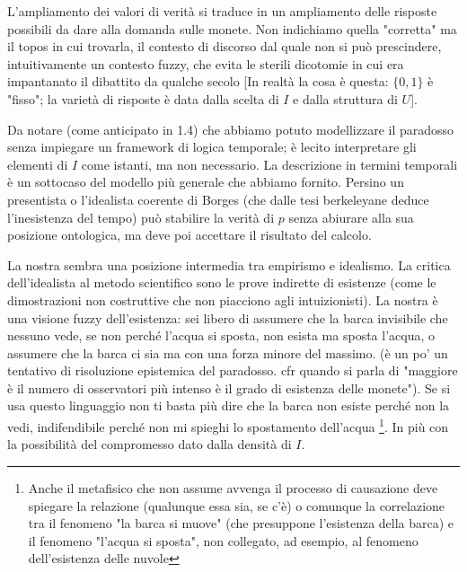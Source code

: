 L'ampliamento dei valori di verità si traduce in un ampliamento delle risposte possibili da dare alla domanda sulle monete. Non indichiamo quella "corretta" ma il topos in cui trovarla, il contesto di discorso dal quale non si può prescindere, intuitivamente un contesto fuzzy, che evita le sterili dicotomie in cui era impantanato il dibattito da qualche secolo [In realtà la cosa è questa: $\{0,1\}$ è "fisso"; la varietà di risposte è data dalla scelta di $I$ e dalla struttura di $U$].

Da notare (come anticipato in 1.4) che abbiamo potuto modellizzare il paradosso senza impiegare un framework di logica temporale; è lecito interpretare gli elementi di $I$ come istanti, ma non necessario. La descrizione in termini temporali è un sottocaso del modello più generale che abbiamo fornito. Persino un presentista o l'idealista coerente di Borges (che dalle tesi berkeleyane deduce l'inesistenza del tempo) può stabilire la verità di $p$ senza abiurare alla sua posizione ontologica, ma deve poi accettare il risultato del calcolo. 


La nostra sembra una posizione intermedia tra empirismo e idealismo. La critica dell'idealista al metodo scientifico sono le prove indirette di esistenze (come le dimostrazioni non costruttive che non piacciono agli intuizionisti). La nostra è una visione fuzzy dell'esistenza: sei libero di assumere che la barca invisibile che nessuno vede, se non perché l'acqua si sposta, non esista ma sposta l'acqua, o assumere che la barca ci sia ma con una forza minore del massimo. (è un po' un tentativo di risoluzione epistemica del paradosso. cfr quando si parla di "maggiore è il numero di osservatori più intenso è il grado di esistenza delle monete"). Se si usa questo linguaggio non ti basta più dire che la barca non esiste perché non la vedi, indifendibile perché non mi spieghi lo spostamento dell'acqua \footnote{Anche il metafisico che non assume avvenga il processo di causazione deve spiegare la relazione (qualunque essa sia, se c'è) o comunque la correlazione tra il fenomeno "la barca si muove" (che presuppone l'esistenza della barca) e il fenomeno "l'acqua si sposta", non collegato, ad esempio, al fenomeno dell'esistenza delle nuvole}. In più con la possibilità del compromesso dato dalla densità di $I$.

